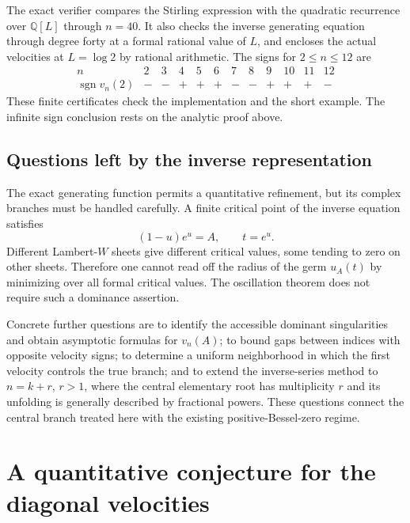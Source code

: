 \documentclass[11pt,a4paper]{article}
\theoremstyle{definition}
\theoremstyle{remark}
\numberwithin{equation}{section}
\begin{document}
The exact verifier compares the Stirling expression with the quadratic
recurrence over $\mathbb Q[L]$ through $n=40$.  It also checks the inverse
generating equation through degree forty at a formal rational value of
$L$, and encloses the actual velocities at $L=\log2$ by rational
arithmetic.  The signs for $2\leq n\leq12$ are
\[
\begin{array}{c|rrrrrrrrrrr}
 n&2&3&4&5&6&7&8&9&10&11&12\\ \hline
 \operatorname{sgn}v_n(2)&-&-&+&+&+&-&-&+&+&+&-
\end{array}
\]
These finite certificates check the implementation and the short example.
The infinite sign conclusion rests on the analytic proof above.

\subsection{Questions left by the inverse representation}
\label{diag:subsec:questions}

The exact generating function permits a quantitative refinement, but its
complex branches must be handled carefully.  A finite critical point of
the inverse equation satisfies
\begin{equation}\label{diag:eq:critical-values}
 (1-u)e^u=A,\qquad t=e^u.
\end{equation}
Different Lambert-$W$ sheets give different critical values, some tending
to zero on other sheets.  Therefore one cannot read off the radius of
the germ $u_A(t)$ by minimizing over all formal critical values.  The
oscillation theorem does not require such a dominance assertion.

Concrete further questions are to identify the accessible dominant
singularities and obtain asymptotic formulas for $v_n(A)$; to bound gaps
between indices with opposite velocity signs; to determine a uniform
neighborhood in which the first velocity controls the true branch; and
to extend the inverse-series method to $n=k+r$, $r>1$, where the central
elementary root has multiplicity $r$ and its unfolding is generally
described by fractional powers.  These questions connect the central
branch treated here with the existing positive-Bessel-zero regime.


\section{A quantitative conjecture for the diagonal velocities}
\label{diag:q:sec}
\end{document}
